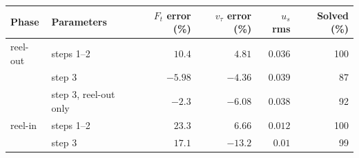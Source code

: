 \begin{tabular}{llrrrr}
\toprule
Phase & Parameters & $F_t$ error (\%) & $v_\tau$ error (\%) & $u_s$ rms & Solved (\%) \\
\midrule
reel-out & steps 1--2 & $10.4$ & $4.81$ & $0.036$ & 100 \\
 & step 3 & $-5.98$ & $-4.36$ & $0.039$ & 87 \\
 & step 3, reel-out only & $-2.3$ & $-6.08$ & $0.038$ & 92 \\
reel-in & steps 1--2 & $23.3$ & $6.66$ & $0.012$ & 100 \\
 & step 3 & $17.1$ & $-13.2$ & $0.01$ & 99 \\
\bottomrule
\end{tabular}
